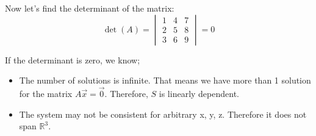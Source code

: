 \documentclass[oneside]{book}
\begin{document}




Now let's find the determinant of the matrix:
\[
    \det(A) = \begin{vmatrix}
        1 & 4 & 7\\
        2 & 5 & 8\\
        3 & 6 & 9
    \end{vmatrix}
    = 
    0
\]

If the determinant is zero, we know; 
\begin{itemize}
    \item The number of solutions is infinite. That means we have more than 1 solution for the matrix $A\vec{x} = \vec{0}$. Therefore, $S$ is linearly dependent.
    \item The system may not be consistent for arbitrary x, y, z. Therefore it does not span $\mathbb{R}^3$.
\end{itemize}
\end{document}
